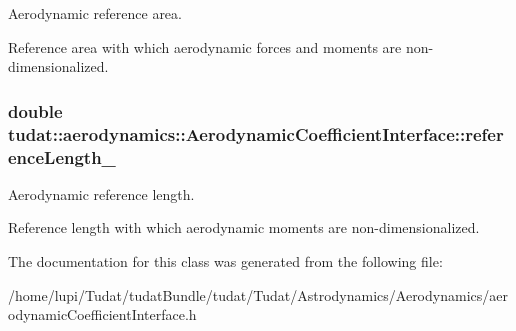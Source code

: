 Aerodynamic reference area. 

Reference area with which aerodynamic forces and moments are non-\/dimensionalized. 
\subsubsection[{\texorpdfstring{reference\+Length\+\_\+}{referenceLength_}}]{\setlength{\rightskip}{0pt plus 5cm}double tudat\+::aerodynamics\+::\+Aerodynamic\+Coefficient\+Interface\+::reference\+Length\+\_\+\hspace{0.3cm}{\ttfamily [protected]}}\hypertarget{classtudat_1_1aerodynamics_1_1AerodynamicCoefficientInterface_a37ca00d965d756bbf54b727516a33a57}{}\label{classtudat_1_1aerodynamics_1_1AerodynamicCoefficientInterface_a37ca00d965d756bbf54b727516a33a57}


Aerodynamic reference length. 

Reference length with which aerodynamic moments are non-\/dimensionalized. 

The documentation for this class was generated from the following file\+:\begin{DoxyCompactItemize}
\item 
/home/lupi/\+Tudat/tudat\+Bundle/tudat/\+Tudat/\+Astrodynamics/\+Aerodynamics/aerodynamic\+Coefficient\+Interface.\+h\end{DoxyCompactItemize}
